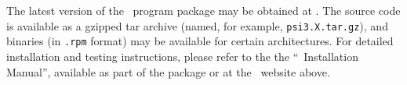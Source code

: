 The latest version of the \PSIthree\ program package may be obtained
at .
The source code is available as a gzipped tar archive (named, for
example, {\tt psi3.X.tar.gz}), and binaries (in {\tt .rpm} format) may
be available for certain architectures.  For detailed installation and
testing instructions, please refer to the the ``\PSIthree\
Installation Manual'', available as part of the package or at the
\PSIthree\ website above.

